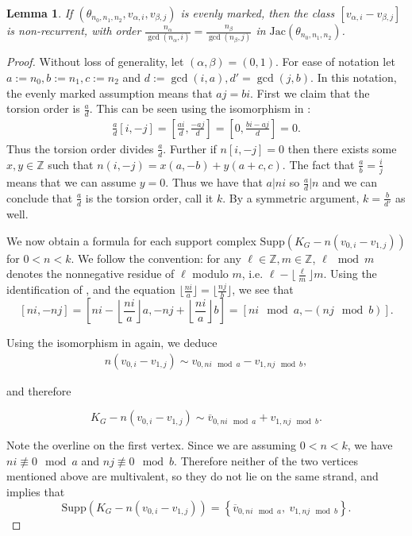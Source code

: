 \documentclass[11pt]{article}
\newtheorem{lemma}[theo]{Lemma}
\theoremstyle{definition}
\numberwithin{equation}{section}
\newcommand{\Z}{\mathbb{Z}}
\newcommand{\jac}[1]{\mathrm{Jac}\left({#1}\right)}
\newcommand{\Supp}{\mathrm{Supp}}
\begin{document}
\begin{lemma}
If $(\theta_{n_0,n_1,n_2},v_{\alpha,i},v_{\beta,j})$ is evenly marked, then the class $[v_{\alpha,i}-v_{\beta,j}]$ is non-recurrent, with order $\frac{n_\alpha}{\gcd(n_\alpha,i)} = \frac{n_\beta}{\gcd(n_\beta, j)}$ in $\jac{\theta_{n_0,n_1,n_2}}$.
\end{lemma}

\begin{proof}
Without loss of generality, let $(\alpha,\beta) = (0,1)$. For ease of notation let $a:= n_0, b:= n_1, c:=n_2$ and $d:= \gcd(i,a),d' = \gcd(j,b)$. In this notation, the evenly marked assumption means that $aj = bi$. First we claim that the torsion order is $\frac{a}{d}$. This can be seen using the isomorphism in :
\begin{align*}
    \frac{a}{d}[i,-j] = \left[\frac{ai }{d},\frac{-aj}{d}\right] = \left[0,\frac{bi - aj}{d}\right] = 0.
\end{align*}
Thus the torsion order divides $\frac{a}{d}$. Further if $n[i,-j] = 0$ then there exists some $x,y \in \Z$ such that $n(i,-j) = x(a,-b) + y(a+c,c)$. The fact that $\frac{a}{b} = \frac{i}{j}$ means that we can assume $y = 0$. Thus we have that $a|ni$ so $\frac{a}{d}|n$ and we can conclude that $\frac{a}{d}$ is the torsion order, call it $k$. By a symmetric argument, $k =\frac{b}{d'}$ as well.

We now obtain a formula for each support complex $\Supp(K_G - n(v_{0,i}-v_{1,j}))$ for $0<n<k$. 
We follow the convention: for any $\ell \in \Z, m \in \Z$, $\ell\mod m$ denotes the nonnegative residue of $\ell$ modulo $m$, i.e. $\ell - \lfloor \frac{\ell}{m} \rfloor m$.
Using the identification of , and the equation $\lfloor \frac{ni}{a} \rfloor = \lfloor \frac{nj}{b} \rfloor$, we see that 
$$[ni,-n j ] = \left[ni - \left\lfloor \frac{ni}{a}\right\rfloor a,-n j + \left\lfloor \frac{ni}{a} \right\rfloor b \right] = \left[ ni \mod a, - (nj \mod b )\right].$$


Using the isomorphism in  again, we deduce 
\begin{align}\label{eq:multDiffMarkedPts}
n(v_{0,i}-v_{1,j}) \sim v_{0,ni \mod a} - v_{1,nj \mod b},
\end{align}

and therefore

$$
K_G - n(v_{0,i} - v_{1,j}) \sim \overline{v}_{0, ni \mod a} + v_{1,nj \mod b}.
$$

Note the overline on the first vertex. Since we are assuming $0 < n < k$, we have $ni \not\equiv 0 \mod a$ and $nj \not\equiv 0 \mod b$. Therefore neither of the two vertices mentioned above are multivalent, so they do not lie on the same strand, and  implies that
$$\Supp \left( K_G - n(v_{0,i} - v_{1,j}) \right)
= \left\{ \overline{v}_{0, ni \mod a},\ v_{1,nj \mod b} \right\}.
$$


\end{proof}
\end{document}
